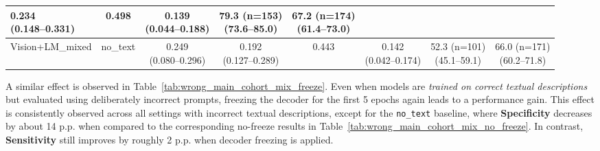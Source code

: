 \documentclass[FCD_GNN.tex]{subfiles}
\begin{document}
\begin{table}[H]
\begin{tabular}{lccccccc}
\makecell{\colorbox{cyan!15}{0.234} \\ (0.148--0.331)} &
0.498 &
\makecell{\colorbox{orange!15}{0.139} \\ (0.044--0.188)} &
\makecell{79.3 (n=153) \\ (73.6--85.0)} &
\makecell{67.2 (n=174) \\ (61.4--73.0)} \\
\hline
Vision+LM\_mixed & no\_text &
\makecell{\colorbox{cyan!15}{0.249} \\ (0.080--0.296)} &
\makecell{0.192 \\ (0.127--0.289)} &
0.443 &
\makecell{\colorbox{cyan!15}{0.142} \\ (0.042--0.174)} &
\makecell{52.3 (n=101) \\ (45.1--59.1)} &
\makecell{66.0 (n=171) \\ (60.2--71.8)} \\

\hline
\end{tabular}
\end{table}

A similar effect is observed in Table~\ref{tab:wrong_main_cohort_mix_freeze}.  
Even when models are \emph{trained on correct textual descriptions} but evaluated using deliberately incorrect prompts, 
freezing the decoder for the first 5 epochs again leads to a performance gain. 
This effect is consistently observed across all settings with incorrect textual descriptions, 
except for the \texttt{no\_text} baseline, where \textbf{Specificity} decreases by about 14 \ac{p.p.} 
when compared to the corresponding no-freeze results in Table~\ref{tab:wrong_main_cohort_mix_no_freeze}. 
In contrast, \textbf{Sensitivity} still improves by roughly 2 \ac{p.p.} when decoder freezing is applied.

\end{document}
